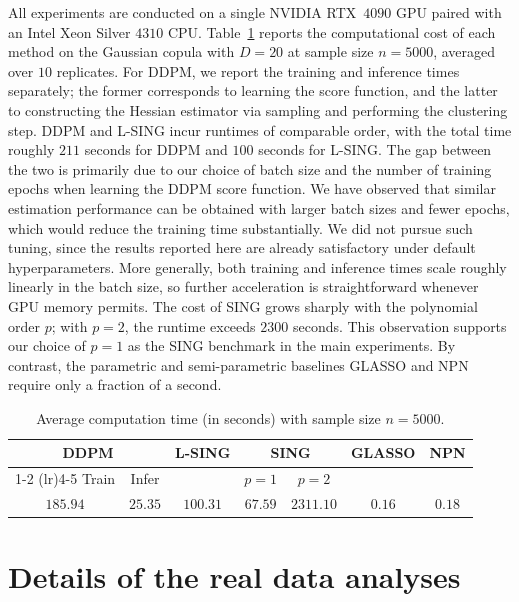 \documentclass[11pt,a4paper,final]{article}
\numberwithin{equation}{section}
\theoremstyle{remark}
\begin{document}
All experiments are conducted on a single NVIDIA RTX~$4090$ GPU paired with an Intel Xeon Silver $4310$ CPU.
Table~\ref{tab:comp_time} reports the computational cost of each method on the Gaussian copula with $D = 20$ at sample size $n = 5000$, averaged over $10$ replicates.
For DDPM, we report the training and inference times separately; the former corresponds to learning the score function, and the latter to constructing the Hessian estimator via sampling and performing the clustering step.
DDPM and L-SING incur runtimes of comparable order, with the total time roughly $211$ seconds for DDPM and $100$ seconds for L-SING.
The gap between the two is primarily due to our choice of batch size and the number of training epochs when learning the DDPM score function.
We have observed that similar estimation performance can be obtained with larger batch sizes and fewer epochs, which would reduce the training time substantially.
We did not pursue such tuning, since the results reported here are already satisfactory under default hyperparameters.
More generally, both training and inference times scale roughly linearly in the batch size, so further acceleration is straightforward whenever GPU memory permits.
The cost of SING grows sharply with the polynomial order $p$; with $p = 2$, the runtime exceeds $2300$ seconds.
This observation supports our choice of $p = 1$ as the SING benchmark in the main experiments.
By contrast, the parametric and semi-parametric baselines GLASSO and NPN require only a fraction of a second.
\begin{table}[!t]
\caption{Average computation time (in seconds) with sample size $n = 5000$.}
\centering
\begin{tabular}{ccccccc}
\toprule
\multicolumn{2}{c}{DDPM} & \multirow{2}{*}{L-SING} & \multicolumn{2}{c}{SING} & \multirow{2}{*}{GLASSO} & \multirow{2}{*}{NPN} \\
\cmidrule(lr){1-2} \cmidrule(lr){4-5}
Train & Infer & & $p=1$ & $p=2$ & & \\
\midrule
$185.94$ & $25.35$ & $100.31$ & $67.59$ & $2311.10$ & $0.16$ & $0.18$ \\
\bottomrule
\end{tabular}
\label{tab:comp_time}
\end{table}

\section{Details of the real data analyses}
\label{sec:supp_add}
\end{document}
